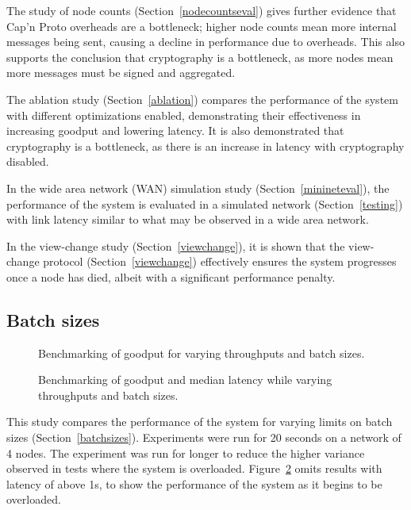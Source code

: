 The study of node counts (Section~\ref{nodecountseval}) gives further evidence that Cap'n Proto overheads are a bottleneck; higher node counts mean more internal messages being sent, causing a decline in performance due to overheads. This also supports the conclusion that cryptography is a bottleneck, as more nodes mean more messages must be signed and aggregated.

The ablation study (Section~\ref{ablation}) compares the performance of the system with different optimizations enabled, demonstrating their effectiveness in increasing goodput and lowering latency. It is also demonstrated that cryptography is a bottleneck, as there is an increase in latency with cryptography disabled.

In the wide area network (WAN) simulation study (Section~\ref{minineteval}), the performance of the system is evaluated in a simulated network (Section~\ref{testing}) with link latency similar to what may be observed in a wide area network.

In the view-change study (Section~\ref{viewchange}), it is shown that the view-change protocol (Section~\ref{viewchange}) effectively ensures the system progresses once a node has died, albeit with a significant performance penalty.

\subsection{Batch sizes} \label{batchsizeseval}

\begin{figure}[h!]
\centering
\resizebox{.6\textwidth}{!}{}
\caption{Benchmarking of goodput for varying throughputs and batch sizes.}
\label{throughputgoodputbatch}
\end{figure}

\begin{figure}[h!]
\centering
\resizebox{.6\textwidth}{!}{}
\caption{Benchmarking of goodput and median latency while varying throughputs and batch sizes.}
\label{goodputlatencybatch}
\end{figure}

This study compares the performance of the system for varying limits on batch sizes (Section~\ref{batchsizes}). Experiments were run for 20 seconds on a network of 4 nodes. The experiment was run for longer to reduce the higher variance observed in tests where the system is overloaded. Figure~\ref{goodputlatencybatch} omits results with latency of above 1s, to show the performance of the system as it begins to be overloaded.

